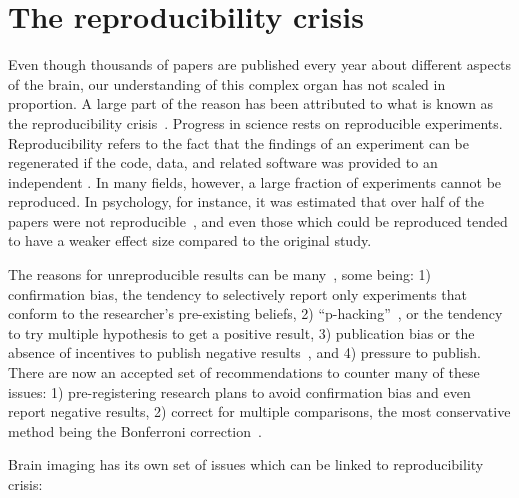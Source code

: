 \section{The reproducibility crisis}

Even though thousands of papers are published every year about different aspects of the brain, our understanding of this complex organ has not scaled in proportion. A large part of the reason has been attributed to what is known as the reproducibility crisis~\citep{ioannidis2005most, simmons2011false, button2013power}. %
Progress in science rests on reproducible experiments. Reproducibility refers to the fact that the findings of an experiment can be regenerated if the code, data, and related software was provided to an independent . In many fields, however, a large fraction of experiments cannot be reproduced. In psychology, for instance, it was estimated that over half of the papers were not reproducible~\citep{open2015estimating}, and even those which could be reproduced tended to have a weaker effect size compared to the original study. 

The reasons for unreproducible results can be many~\citep{baker20161}, some being: 1) confirmation bias, the tendency to selectively report only experiments that conform to the researcher's pre-existing beliefs, 2) ``p-hacking''~\citep{simmons2011false}, or the tendency to try multiple hypothesis to get a positive result, 3) publication bias or the absence of incentives to publish negative results~\citep{rosenthal1979file}, and 4) pressure to publish. There are now an accepted set of recommendations to counter many of these issues: 1) pre-registering research plans to avoid confirmation bias and even report negative results, 2) correct for multiple comparisons, the most conservative method being the Bonferroni correction~\citep{dunn1961multiple}. 

Brain imaging has its own set of issues which can be linked to reproducibility crisis: 



